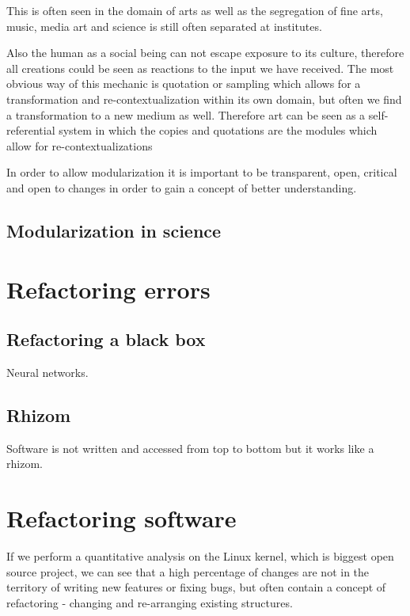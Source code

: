 \documentclass[10pt,twocolumn,letterpaper]{article}
\begin{document}
This is often seen in the domain of arts as well as the segregation of fine arts, music, media art and science is still often separated at institutes.

Also the human as a social being can not escape exposure to its culture, therefore all creations could be seen as reactions to the input we have received.
The most obvious way of this mechanic is quotation or sampling which allows for a transformation and re-contextualization within its own domain, but often we find a transformation to a new medium as well.
Therefore art can be seen as a self-referential system in which the copies and quotations are the modules which allow for re-contextualizations 

In order to allow modularization it is important to be transparent, open, critical and open to changes in order to gain a concept of better understanding.

\cite{bratton_stack_2015}

\subsection{Modularization in science}

\section{Refactoring errors}

\subsection{Refactoring a black box}

Neural networks.

\subsection{Rhizom}

Software is not written and accessed from top to bottom but it works like a rhizom.

\section{Refactoring software}

If we perform a quantitative analysis on the Linux kernel, which is biggest open source project, we can see
that a high percentage of changes are not in the territory of writing new features or fixing bugs, but often 
contain a concept of refactoring - changing and re-arranging existing structures.
\end{document}
